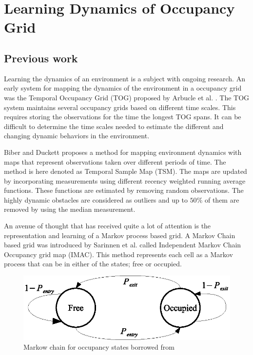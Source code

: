 \section{Learning Dynamics of Occupancy Grid}
\label{sec:learning_dynamics_of_env}

\subsection{Previous work}
Learning the dynamics of an environment is a subject with ongoing research.
An early system for mapping the dynamics of the environment in a occupancy grid was the Temporal Occupancy Grid (TOG) proposed by Arbucle et al. \cite{Arbuckle2002}. The TOG system maintains several occupancy grids based on different time scales. This requires storing the observations for the time the longest TOG spans. It can be difficult to determine the time scales needed to estimate the different and changing dynamic behaviors in the environment.

Biber and Duckett \cite{Biber2005} proposes a method for mapping environment dynamics with maps that represent observations taken over different periods of time. The method is here denoted as Temporal Sample Map (TSM). The maps are updated by incorporating measurements using different recency weighted running average functions. These functions are estimated by removing random observations. The highly dynamic obstacles are considered as outliers and up to $50\%$ of them are removed by using the median measurement.

An avenue of thought that has received quite a lot of attention is the representation and learning of a Markov process based grid. A Markov Chain based grid was introduced by Sarinnen et al. \cite{Saarinen2012} called Independent Markov Chain Occupancy grid map (IMAC). This method represents each cell as a Markov process that can be in either of the states; free or occupied. 

\begin{figure}[tbph]
	\centering
	\includegraphics[width=0.7\linewidth]{chapters/mapping_of_dynamic_areas/figures/markow_occupancy_model}
	\caption{Markow chain for occupancy states borrowed from \cite{Saarinen2012}}
	\label{fig:markow_occupancy_model}
\end{figure}

